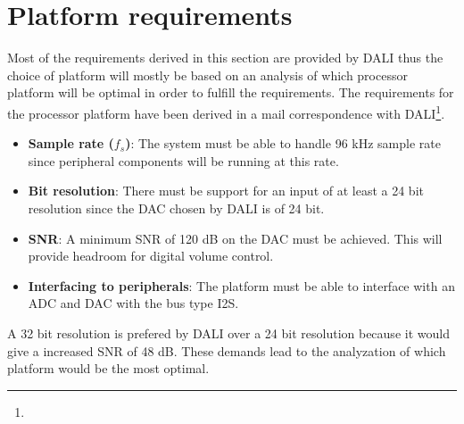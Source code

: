 \section{Platform requirements} \label{sec:platformReq}
Most of the requirements derived in this section are provided by DALI thus the choice of platform will mostly be based on an analysis of which processor platform will be optimal in order to fulfill the requirements. The requirements for the processor platform have been derived in a mail correspondence with DALI\footnote{}.
\begin{itemize}
\item \textbf{Sample rate ($f_s$)}: The system must be able to handle 96 kHz sample rate since peripheral components will be running at this rate.
\item \textbf{Bit resolution}: There must be support for an input of at least a 24 bit resolution since the \gls{DAC} chosen by DALI is of 24 bit.
\item \textbf{\gls{SNR}}: A minimum \gls{SNR} of 120 dB on the \gls{DAC} must be achieved. This will provide headroom for digital volume control.
\item \textbf{Interfacing to peripherals}: The platform must be able to interface with an ADC and DAC with the bus type \gls{I2S}.
\end{itemize}
A 32 bit resolution is prefered by DALI over a 24 bit resolution because it would give a increased \gls{SNR} of 48 dB. These demands lead to the analyzation of which platform would be the most optimal.  


